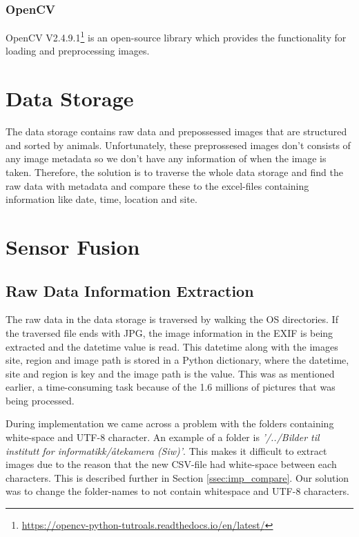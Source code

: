 \documentclass[USenglish]{uit-thesis}
\begin{document}
\subsubsection{OpenCV} \label{sssec:imp_cv}
OpenCV V2.4.9.1\footnote{\url{https://opencv-python-tutroals.readthedocs.io/en/latest/}} is an open-source library which provides the functionality for loading and preprocessing images.



\section{Data Storage} \label{sec:imp_storage}
The data storage contains raw data and prepossessed images that are structured and sorted by animals. Unfortunately, these preprossesed images don't consists of any image metadata so we don't have any information of when the image is taken. Therefore, the solution is to traverse the whole data storage and find the raw data with metadata and compare these to the excel-files containing information like date, time, location and site.


\section{Sensor Fusion} \label{sec:imp_senfus}
\subsection{Raw Data Information Extraction} \label{ssec:imp_rawdata}
The raw data in the data storage is traversed by walking the OS directories. If the traversed file ends with JPG, the image information in the EXIF is being extracted and the datetime value is read. This datetime along with the images site, region and image path is stored in a Python dictionary, where the datetime, site and region is key and the image path is the value. This was as mentioned earlier, a time-consuming task because of the 1.6 millions of pictures that was being processed.

During implementation we came across a problem with the folders containing white-space and UTF-8 character. An example of a folder is \textit{'/../Bilder til institutt for informatikk/åtekamera (Siw)'}. This makes it difficult to extract images due to the reason that the new CSV-file had white-space between each characters. This is described further in Section \ref{ssec:imp_compare}. Our solution was to change the folder-names to not contain whitespace and UTF-8 characters.
\end{document}
